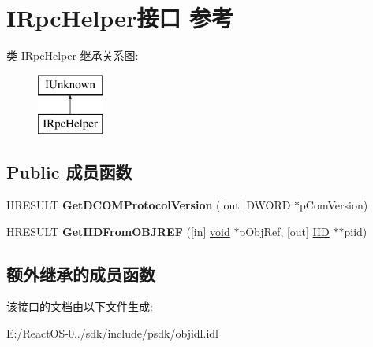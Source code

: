 \hypertarget{interface_i_rpc_helper}{}\section{I\+Rpc\+Helper接口 参考}
\label{interface_i_rpc_helper}
类 I\+Rpc\+Helper 继承关系图\+:\begin{figure}[H]
\begin{center}
\leavevmode
\includegraphics[height=2.000000cm]{interface_i_rpc_helper}
\end{center}
\end{figure}
\subsection*{Public 成员函数}
\begin{DoxyCompactItemize}
\item 
\mbox{\label{interface_i_rpc_helper_aa7288973d5a116fa1bc355fe9f9fa25a}} 
H\+R\+E\+S\+U\+LT {\bfseries Get\+D\+C\+O\+M\+Protocol\+Version} (\mbox{[}out\mbox{]} D\+W\+O\+RD $\ast$p\+Com\+Version)
\item 
\mbox{\label{interface_i_rpc_helper_abd22262dc24aa655a6e2dd33018c37af}} 
H\+R\+E\+S\+U\+LT {\bfseries Get\+I\+I\+D\+From\+O\+B\+J\+R\+EF} (\mbox{[}in\mbox{]} \hyperlink{interfacevoid}{void} $\ast$p\+Obj\+Ref, \mbox{[}out\mbox{]} \hyperlink{struct___i_i_d}{I\+ID} $\ast$$\ast$piid)
\end{DoxyCompactItemize}
\subsection*{额外继承的成员函数}


该接口的文档由以下文件生成\+:\begin{DoxyCompactItemize}
\item 
E\+:/\+React\+O\+S-\/0../sdk/include/psdk/objidl.\+idl\end{DoxyCompactItemize}
